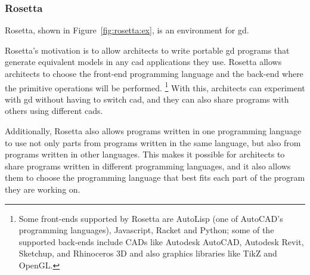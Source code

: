 

\subsubsection{Rosetta}
\label{section:rosetta:related}
Rosetta\cite{de2012modern,lopes2011portable}, shown in Figure~\ref{fig:rosetta:ex}, is an environment for \gls{gd}.


Rosetta's motivation is to allow architects to write portable \gls{gd} programs that generate equivalent models in any \gls{cad} applications they use.
Rosetta allows architects to choose the front-end programming language and the back-end where the primitive operations will be performed\cite{de2012modern}.%
\footnote{Some front-ends supported by Rosetta are AutoLisp (one of AutoCAD's programming languages), Javascript, Racket and Python; some of the supported back-ends include CADs like Autodesk AutoCAD, Autodesk Revit, Sketchup, and Rhinoceros 3D and also graphics libraries like TikZ and OpenGL.}
With this, architects can experiment with \gls{gd} without having to switch \gls{cad}, and they can also share programs with others using different \glspl{cad}.

Additionally, Rosetta also allows programs written in one programming language to use not only parts from programs written in the same language, but also from programs written in other languages.
This makes it possible for architects to share programs written in different programming languages, and it also allows them to choose the programming language that best fits each part of the program they are working on.

